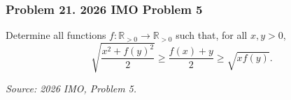 \subsubsection*{Problem 21. 2026 IMO Problem 5}

\begin{exercisebox}[medium]

Determine all functions $f:\mathbb{R}_{>0}\to\mathbb{R}_{>0}$ such that,
for all $x,y>0$,
\[
\sqrt{\frac{x^2+f(y)^2}{2}}
\ge \frac{f(x)+y}{2}
\ge \sqrt{x f(y)}.
\]

\begin{flushright}
\textit{Source: 2026 IMO, Problem 5.}
\end{flushright}


\end{exercisebox}